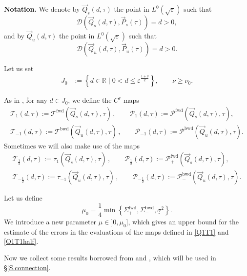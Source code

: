 \documentclass[10pt]{article}
\numberwithin{equation}{section}
\def\sTfwd{\Sigma^{\textrm{fwd}}}
\def\sTbwd{\Sigma^{\textrm{bwd}}}
\def\dist{{\mathscr{D}}}
\def\ep{\varepsilon}
\def\si{\sigma}
\def\R{{\mathbb R}}
\def\Q{\vec{Q}}
\def\P{\vec{P}}
\def\und{\underline}
\theoremstyle{definition}
\theoremstyle{remark}
\begin{document}
\textbf{Notation.}
We denote by $\Q_s(d,\tau)$ the point in $L^0(\sqrt{\ep})$ such that
\[
\dist(\Q_s(d,\tau), \P_s(\tau))=d>0,
\]
and by $\Q_u(d,\tau)$ the point in $L^0(\sqrt{\ep})$ such that
\[
\dist(\Q_u(d,\tau), \P_u(\tau))=d>0.
\]


Let us set
\begin{equation}
\begin{split}
     J_0  & :=  \left\{ d \in \R \mid 0< d \le \ep^{\frac{1+\nu}{\und{\si}}} \right\}, \qquad \nu \ge \nu_0.
  \label{J0}
\end{split}
\end{equation}

As in \cite{CFPRimut},
 for any $d \in J_0$,
we  define the $C^r$ maps
\begin{equation}\label{Q1T1}
\begin{gathered}
\mathscr{T}_1(d,\tau):=   \mathscr{T}^{\textrm{fwd}}(\Q_s(d,\tau),\tau) \, , \qquad \mathscr{P}_1(d,\tau):=
\mathscr{P}^{\textrm{fwd}}(\Q_s(d,\tau),\tau),\\
\mathscr{T}_{-1}(d,\tau):=   \mathscr{T}^{\textrm{bwd}}(\Q_u(d,\tau),\tau) \, , \qquad \mathscr{P}_{-1}(d,\tau):=
\mathscr{P}^{\textrm{bwd}}(\Q_u(d,\tau),\tau).
\end{gathered}
\end{equation}
Sometimes we will also make use of the maps
\begin{equation}\label{Q1T1half}
\begin{gathered}
\mathscr{T}_{\frac{1}{2}}(d,\tau):=   \tau_1(\Q_s(d,\tau),\tau) \, , \qquad \mathscr{P}_{\frac{1}{2}}(d,\tau):=
\mathscr{P}^{\textrm{fwd}}_+(\Q_s(d,\tau),\tau),\\
\mathscr{T}_{-\frac{1}{2}}(d,\tau):=   \tau_{-1}(\Q_u(d,\tau),\tau) \, , \qquad \mathscr{P}_{-\frac{1}{2}}(d,\tau):=
\mathscr{P}^{\textrm{bwd}}_-(\Q_u(d,\tau),\tau).
\end{gathered}
\end{equation}


Let us    define
\begin{equation}\label{mu0}
\mu_0= \frac{1}{4} \min \left\{ \sTfwd_+ , \sTbwd_- ,  \und{\sigma}^2    \right\}.
\end{equation}
We introduce a new parameter $\mu \in ]0, \mu_0]$, which gives an upper bound for the estimate of the errors
in the evaluations of the maps defined in \eqref{Q1T1} and \eqref{Q1T1half}.

Now we collect some results borrowed from \cite{CFPRimut} and \cite{CFPrestate}, which will be used in
\S \ref{S.connection}.
\end{document}
